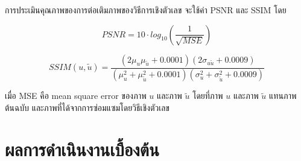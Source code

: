 \documentclass[hidelinks, a4paper,12pt]{article}
\numberwithin{equation}{section}							%
\numberwithin{equation}{section}
\begin{document}
{\hspace{1cm} การประเมินคุณภาพของการต่อเติมภาพของวิธีการเชิงตัวเลข จะใช้ค่า PSNR \cite{ref:PSNR} และ SSIM \cite{ref:SSIM} โดย

$$ PSNR = 10 \cdot log_{10} ( \frac{1}{\sqrt{MSE}} )$$

$$ SSIM(u,\tilde{u}) = \frac{(2\mu_u\mu_{\tilde{u}} + 0.0001)(2\sigma_{u\tilde{u}} + 0.0009)}{(\mu_u^2+\mu_{\tilde{u}}^2+0.0001)(\sigma_u^2+\sigma_{\tilde{u}}^2+0.0009)}$$

\hspace{1cm}  เมื่อ MSE คือ mean square error ของภาพ $u$ และภาพ $\tilde{u}$ โดยที่ภาพ $u$ และภาพ $\tilde{u}$  แทนภาพต้นฉบับ และภาพที่ได้จากการซ่อมแซมโดยวิธีเชิงตัวเลข

\vspace{1cm}

\section{ผลการดำเนินงานเบื้องต้น}
}
\end{document}
